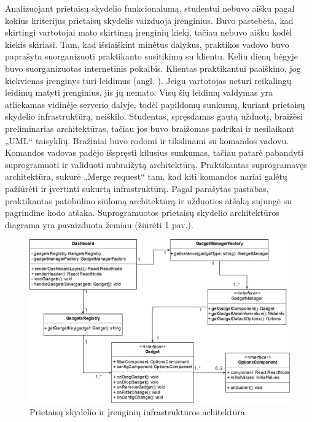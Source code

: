 \documentclass{VUMIFPSbakalaurinis}
\begin{document}
Analizuojant prietaisų skydelio funkcionalumą, studentui nebuvo aišku pagal kokius kriterijus prietaisų skydelis vaizduoja įrenginius. Buvo pastebėta, kad skirtingi vartotojai mato skirtingą įrenginių kiekį, tačiau nebuvo aišku kodėl kiekis skiriasi. Tam, kad išsiaiškint minėtus dalykus, praktikos vadovo buvo paprašyta suorganizuoti praktikanto susitikimą su klientu. Keliu dienų bėgyje buvo suorganizuotas internetinis pokalbis. Klientas praktikantui paaiškino, jog kiekvienas įrenginys turi leidimus (angl. ). Jeigu vartotojas neturi reikalingų leidimų matyti įrenginius, jis jų nemato. Visų šių leidimų valdymas yra atliekamas vidinėje serverio dalyje, todėl papildomų sunkumų, kuriant prietaisų skydelio infrastruktūrą, neiškilo. Studentas, spręsdamas gautą užduotį, braižėsi preliminarias architektūras, tačiau jos buvo braižomas padrikai ir nesilaikant „UML“ taisyklių. Bražiniai buvo rodomi ir tikslinami su komandos vadovu. Komandos vadovas padėjo išspręsti kilusius sunkumas, tačiau patarė pabandyti suprogramuoti ir validuoti nubraižytą architektūrą. Praktikantas suprogramavęs architektūra, sukurė „Merge request“ tam, kad kiti komandos nariai galėtų pažiūrėti ir įvertinti sukurtą infrastruktūrą. Pagal parašytas pastabas, praktikantas patobūlino siūlomą architektūrą ir užduoties atšaką sujungė su pagrindine kodo atšaka. Suprogramuotos prietaisų skydelio architektūros diagrama yra pavaizduota žemiau (žiūrėti 1 pav.).


\begin{figure}[H]
    \centering
    \includegraphics[scale=0.45]{images/gadgets}
    \caption{Prietaisų skydelio ir įrenginių infrastruktūros achitektūra} 
\end{figure}
\end{document}
